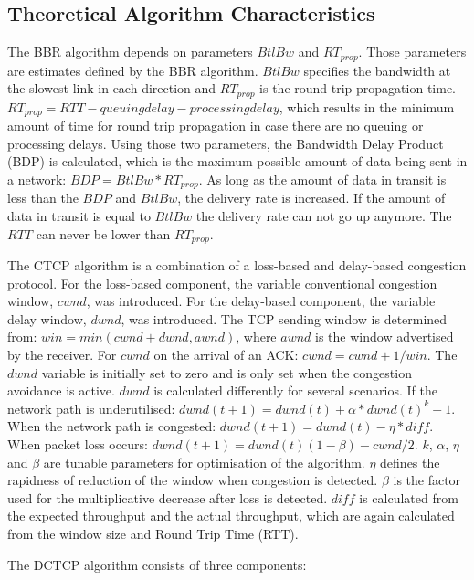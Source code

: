 \documentclass{article}
\begin{document}
\subsection{Theoretical Algorithm Characteristics}\label{sub:algos-theoretical}

The BBR algorithm depends on parameters $BtlBw$ and $RT_{prop}$\cite{bbr-congestion}. Those parameters are estimates defined by the BBR algorithm. $BtlBw$ specifies the bandwidth at the slowest link in each direction and $RT_{prop}$ is the round-trip propagation time. $RT_{prop} = RTT - queuing delay - processing delay$, which results in the minimum amount of time for round trip propagation in case there are no queuing or processing delays. Using those two parameters, the Bandwidth Delay Product (BDP) is calculated, which is the maximum possible amount of data being sent in a network: $BDP = BtlBw * RT_{prop}$. As long as the amount of data in transit is less than the $BDP$ and $BtlBw$, the delivery rate is increased. If the amount of data in transit is equal to $BtlBw$ the delivery rate can not go up anymore. The $RTT$ can never be lower than $RT_{prop}$.

The CTCP algorithm is a combination of a loss-based and delay-based congestion protocol\cite{compound-tcp-congestion}. For the loss-based component, the variable conventional congestion window, $cwnd$, was introduced. For the delay-based component, the variable delay window, $dwnd$, was introduced. The TCP sending window is determined from: $win = min(cwnd + dwnd, awnd)$, where $awnd$ is the window advertised by the receiver. For $cwnd$ on the arrival of an ACK: $cwnd = cwnd + 1/win$. The $dwnd$ variable is initially set to zero and is only set when the congestion avoidance is active. $dwnd$ is calculated differently for several scenarios. If the network path is underutilised: $dwnd(t+1) = dwnd(t) + \alpha*dwnd(t)^{k} - 1$. When the network path is congested: $dwnd(t+1) = dwnd(t) - \eta*diff$. When packet loss occurs: $dwnd(t+1) = dwnd(t)(1-\beta) - cwnd/2$. $k$, $\alpha$, $\eta$ and $\beta$ are tunable parameters for optimisation of the algorithm. $\eta$ defines the rapidness of reduction of the window when congestion is detected. $\beta$ is the factor used for the multiplicative decrease after loss is detected. $diff$ is calculated from the expected throughput and the actual throughput, which are again calculated from the window size and Round Trip Time (RTT).

The DCTCP algorithm\cite{dctcp-congestion-original} consists of three components:
\end{document}
